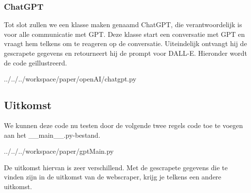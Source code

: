 \subsubsection{ChatGPT}
Tot slot zullen we een klasse maken genaamd ChatGPT, die verantwoordelijk is voor alle communicatie met GPT. Deze klasse start een conversatie met GPT en vraagt hem telkens om te reageren op de conversatie. Uiteindelijk ontvangt hij de gescrapete gegevens en retourneert hij de prompt voor DALL-E. Hieronder wordt de code geïllustreerd.
\begin{pythoncode}{../../../workspace/paper/openAI/chatgpt.py}
\end{pythoncode}

\subsection{Uitkomst}
We kunnen deze code nu testen door de volgende twee regels code toe te voegen aan het \_\_main\_\_.py-bestand.
\begin{pythoncode}{../../../workspace/paper/gptMain.py}
\end{pythoncode}
De uitkomst hiervan is zeer verschillend. Met de gescrapete gegevens die te vinden zijn in de uitkomst van de webscraper, krijg je telkens een andere uitkomst.

